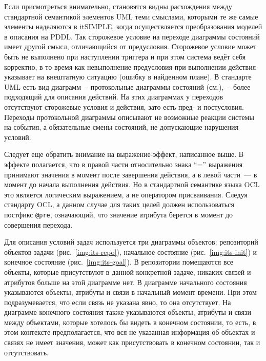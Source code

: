 Если присмотреться внимательно, становятся видны расхождения между стандартной семантикой элементов UML теми смыслами, которыми те же самые элементы наделяются в itSIMPLE, когда осуществляется преобразования моделей в описания на PDDL. Так сторожевое условие на переходе диаграммы состояний имеет другой смысл, отличающийся от предусловия. Сторожевое условие может быть не выполнено при наступлении триггера и при этом система ведёт себя корректно, в то время как невыполнение предусловия при выполнении действия указывает на внештатную ситуацию (ошибку в найденном плане). В стандарте UML есть вид диаграмм~-- протокольные диаграммы состояний (см.\cite{arlou}),~-- более подходящий для описания действий. На этих диаграммах у переходов отсутствуют сторожевые условия и действия, зато есть пред- и постусловия. Переходы протокольной диаграммы описывают не возможные реакции системы на события, а обязательные смены состояний, не допускающие нарушения условий. 

Следует еще обратить внимание на выражение-эффект, написанное выше. В эффекте полагается, что в правой части относительно знака ``='' выражения принимают значения в момент после завершения действия, а в левой части~--- в момент до начала выполнения действия. Но в стандартной семантике языка OCL это является логическим выражением, а не оператором присваивания. Следуя стандарту OCL, а данном случае для таких целей должен использоваться постфикс \texttt{@pre}, означающий, что значение атрибута берется в момент до совершения перехода.

Для описания условий задач используется три диаграммы объектов: репозиторий объектов задачи (рис.~\ref{img:its-repo}), начальное состояние (рис.~\ref{img:its-init}) и конечное состояние (рис.~\ref{img:its-goal}). В репозитории помещаются все объекты, которые присутствуют в данной конкретной задаче, никаких связей и атрибутов больше на этой диаграмме нет. В диаграмме начального состояния указываются объекты, атрибуты и связи в начальный момент времени. При этом подразумевается, что если связь не указана явно, то она отсутствует. На диаграмме конечного состояния также указываются объекты, атрибуты и связи между объектами, которые хотелось бы видеть в конечном состоянии, то есть, в этом контексте предполагается, что вся не указанная информация об объектах и связях не имеет значения, может как присутствовать в конечном состоянии, так и отсутствовать.
\\



